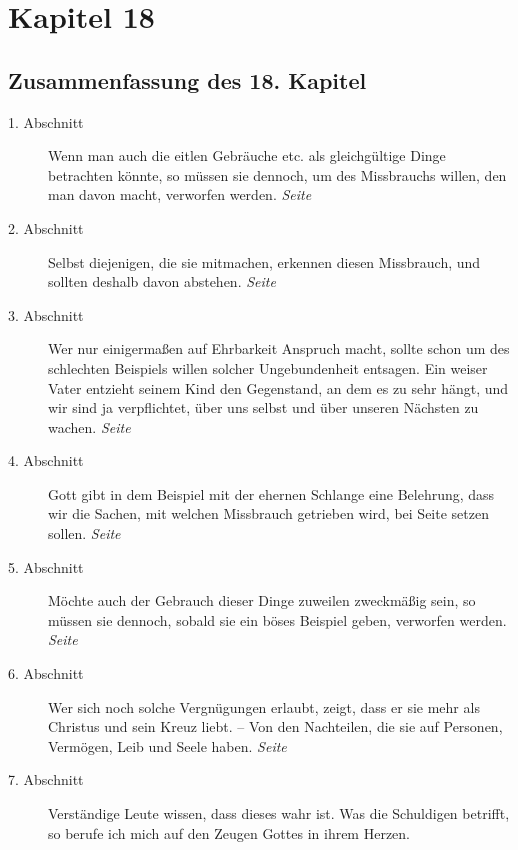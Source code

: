 
\chapter{Kapitel 18} \label{kap18}
\section{Zusammenfassung des 18. Kapitel}

\begin{description}
\item[1. Abschnitt] Wenn man auch die eitlen Gebräuche etc. als gleichgültige
Dinge betrachten könnte, so müssen sie dennoch, um des Missbrauchs willen, den
man davon macht, verworfen werden.
\dotfill \textit{Seite~\pageref{kap18_ab1}}\\
\item[2. Abschnitt] Selbst diejenigen, die sie mitmachen, erkennen diesen
Missbrauch, und sollten deshalb davon abstehen.
\dotfill \textit{Seite~\pageref{kap18_ab2}}\\
\item[3. Abschnitt] Wer nur einigermaßen auf Ehrbarkeit Anspruch macht, sollte
schon um des schlechten Beispiels willen solcher Ungebundenheit entsagen. Ein
weiser Vater entzieht seinem Kind den Gegenstand, an dem es zu sehr hängt, und
wir sind ja verpflichtet, über uns selbst und über unseren Nächsten zu wachen.
\dotfill \textit{Seite~\pageref{kap18_ab3}}\\
\item[4. Abschnitt] Gott gibt in dem Beispiel mit der ehernen Schlange eine
Belehrung, dass wir die Sachen, mit welchen Missbrauch getrieben wird, bei
Seite setzen sollen.
\dotfill \textit{Seite~\pageref{kap18_ab4}}\\
\item[5. Abschnitt] Möchte auch der Gebrauch dieser Dinge zuweilen zweckmäßig
sein, so müssen sie dennoch, sobald sie ein böses Beispiel geben, verworfen
werden.
\dotfill \textit{Seite~\pageref{kap18_ab5}}\\
\item[6. Abschnitt] Wer sich noch solche Vergnügungen erlaubt, zeigt, dass er
sie
mehr als Christus und sein Kreuz liebt. -- Von den Nachteilen, die sie auf
Personen, Vermögen, Leib und Seele haben.
\dotfill \textit{Seite~\pageref{kap18_ab6}}\\
\item[7. Abschnitt] Verständige Leute wissen, dass dieses wahr ist. Was die
Schuldigen betrifft, so berufe ich mich auf den Zeugen Gottes in ihrem Herzen.

\end{description}
